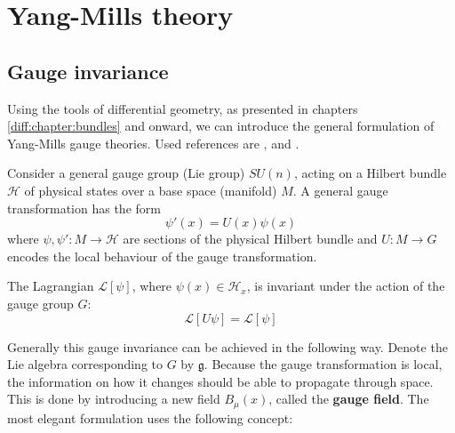 \chapter{Yang-Mills theory}

\section{Gauge invariance}

	Using the tools of differential geometry, as presented in chapters \ref{diff:chapter:bundles} and onward, we can introduce the general formulation of Yang-Mills gauge theories. Used references are \cite{principal_bundles}, \cite{sen_nash} and \cite{schuller}.

	Consider a general gauge group (Lie group) $SU(n)$, acting on a Hilbert bundle $\mathcal{H}$ of physical states over a base space (manifold) $M$. A general gauge transformation has the form
	\begin{equation}
		\label{qft:gauge_transformation}
		\psi'(x) = U(x)\psi(x)
	\end{equation}
	where $\psi, \psi':M\rightarrow\mathcal{H}$ are sections of the physical Hilbert bundle and $U:M\rightarrow G$ encodes the local behaviour of the gauge transformation.
	
	\begin{theorem}
		The Lagrangian $\mathcal{L}[\psi]$, where $\psi(x)\in\mathcal{H}_x$, is invariant under the action of the gauge group $G$:
		\begin{equation}
			\mathcal{L}[U\psi] = \mathcal{L}[\psi]
		\end{equation}
	\end{theorem}
	
	Generally this gauge invariance can be achieved in the following way. Denote the Lie algebra corresponding to $G$ by $\mathfrak{g}$. Because the gauge transformation is local, the information on how it changes should be able to propagate through space. This is done by introducing a new field $B_\mu(x)$, called the \textbf{gauge field}. The most elegant formulation uses the following concept:
	
